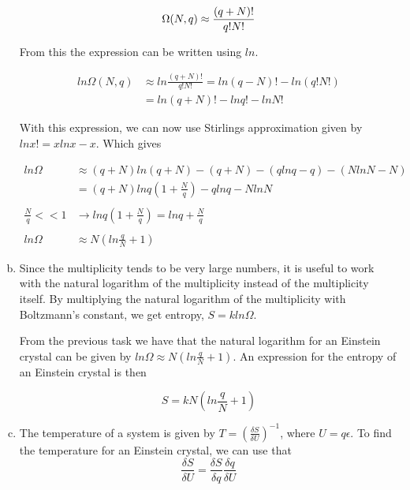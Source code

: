 \documentclass[a4paper,norsk,12pt,oneside]{article}
\begin{document}
\begin{enumerate}[a)]
         \begin{equation}
            \label{eq:2}
            \Omega(N,q) \approx \frac{(q + N)!}{q!N!}\\ 
        \end{equation}   

        From this the expression can be written using \(ln\). 

        \begin{align*}
             ln\Omega(N,q) &\approx ln\frac{(q + N)!}{q!N!} = ln(q-N)! - ln(q!N!)\\
             & = ln(q + N)! - ln q! - ln N!
        \end{align*}

         With this expression, we can now use Stirlings approximation given by 
        \(ln x! = xlnx - x\). Which gives

        \begin{align*}
            ln\Omega &\approx (q+N)ln(q+N) - (q+N) - (q lnq - q) - (N lnN -N)\\
            &= (q + N)lnq(1 + \frac{N}{q}) - qlnq - NlnN \\ \\
            \frac{N}{q} << 1  &\rightarrow  lnq(1 + \frac{N}{q}) = lnq + \frac{N}{q} \\ \\
            ln\Omega &\approx N(ln \frac{q}{N} + 1)
        \end{align*}

    \item

        Since the multiplicity tends to be very large numbers, it is useful to work with
        the natural logarithm of the multiplicity instead of the multiplicity itself. 
        By multiplying the natural logarithm of the multiplicity with Boltzmann's constant,
        we get entropy, \(S = kln\Omega\). 

        From the previous task we have that the natural logarithm for an Einstein crystal 
        can be given by \(ln\Omega \approx N(ln \frac{q}{N} + 1) \). An expression for the
        entropy of an Einstein crystal is then

        \begin{equation*}
           S =  kN(ln \frac{q}{N} + 1)
        \end{equation*}

    \item

        The temperature of a system is given by \(T = \left ( \frac{\delta S}{\delta 
        U}\right ) ^{-
        1} \), where \(U = q\epsilon\). To find the temperature for an Einstein crystal, we 
        can use that
        \begin{equation*}
            \frac{\delta S}{\delta U} = \frac{\delta S}{\delta q} \frac{\delta q}{\delta U}
        \end{equation*}


\end{enumerate}
\end{document}
